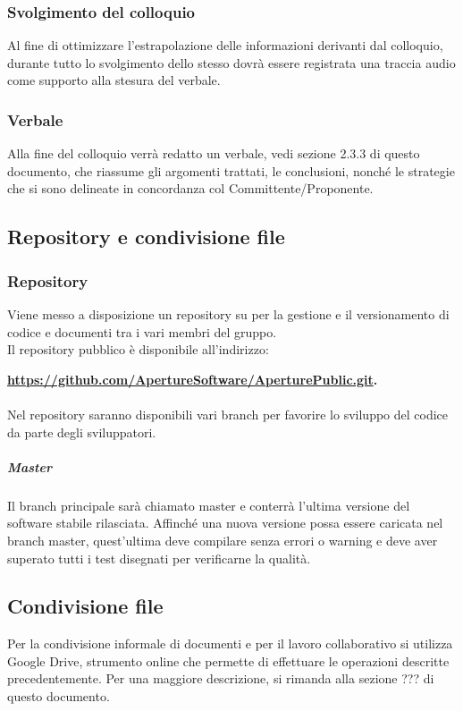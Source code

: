 \subsubsection{Svolgimento del colloquio}
Al fine di ottimizzare l'estrapolazione delle informazioni derivanti dal colloquio, durante tutto lo svolgimento dello stesso dovrà essere registrata una traccia audio come supporto alla stesura del verbale.

\subsubsection{Verbale}
\label{3.4.3}
Alla fine del colloquio verrà redatto un verbale, vedi sezione 2.3.3 di questo documento, che riassume gli argomenti trattati, le conclusioni, nonché le strategie che si sono delineate in concordanza col Committente/Proponente.

\subsection{Repository e condivisione file}
\subsubsection{Repository}
Viene messo a disposizione un repository  su  per la gestione e il versionamento di codice e documenti tra i vari membri del gruppo.\\
Il repository pubblico è disponibile all'indirizzo: \\
\begin{center}
\textbf{\url{https://github.com/ApertureSoftware/AperturePublic.git}.}
\end{center}

\paragraph{}
\label{4.4}
Nel repository saranno disponibili vari branch per favorire lo sviluppo del codice da parte degli sviluppatori.

\subparagraph{Master}
\label{4.4.1}
Il branch principale sarà chiamato master e conterrà l'ultima versione del software stabile rilasciata. Affinché una nuova versione possa essere caricata nel branch master, quest'ultima deve compilare senza errori o warning e deve aver superato tutti i test disegnati per verificarne la qualità.

\subsection{Condivisione file}
Per la condivisione informale di documenti e per il lavoro collaborativo si utilizza Google Drive, strumento online che permette di effettuare le operazioni descritte precedentemente. Per una maggiore descrizione, si rimanda alla sezione ??? di questo documento.

